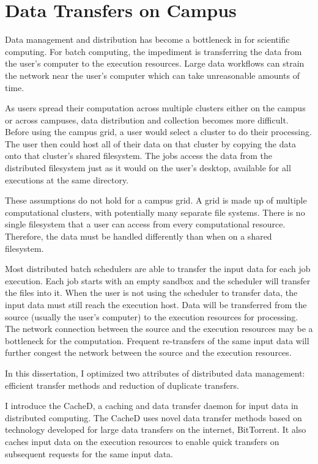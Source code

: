 




\section{Data Transfers on Campus}

Data management and distribution has become a bottleneck in for scientific computing.  For batch computing, the impediment is transferring the data from the user's computer to the execution resources.  Large data workflows can strain the network near the user's computer which can take unreasonable amounts of time.

As users spread their computation across multiple clusters either on the campus or across campuses, data distribution and collection becomes more difficult.  Before using the campus grid, a user would select a cluster to do their processing.  The user then could host all of their data on that cluster by copying the data onto that cluster's shared filesystem.  The jobs access the data from the distributed filesystem just as it would on the user's desktop, available for all executions at the same directory.

These assumptions do not hold for a campus grid.  A grid is made up of multiple computational clusters, with potentially many separate file systems.  There is no single filesystem that a user can access from every computational resource.  Therefore, the data must be handled differently than when on a shared filesystem.  


Most distributed batch schedulers are able to transfer the input data for each job execution.  Each job starts with an empty sandbox and the scheduler will transfer the files into it.  When the user is not using the scheduler to transfer data, the input data must still reach the execution host.  Data will be transferred from the source (usually the user's computer) to the execution resources for processing.  The network connection between the source and the execution resources may be a bottleneck for the computation.  Frequent re-transfers of the same input data will further congest the network between the source and the execution resources.

In this dissertation, I optimized two attributes of distributed data management: efficient transfer methods and reduction of duplicate transfers.

I introduce the CacheD, a caching and data transfer daemon for input data in distributed computing.  The CacheD uses novel data transfer methods based on technology developed for large data transfers on the internet, BitTorrent.  It also caches input data on the execution resources to enable quick transfers on subsequent requests for the same input data.



